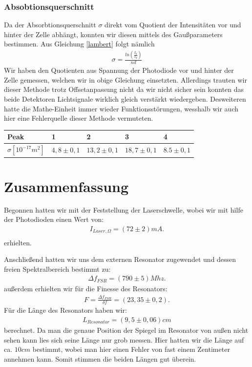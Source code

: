 \documentclass[12pt]{article}
\begin{document}
\subsubsection{Absobtionsquerschnitt}
Da der Absorbtionsquerschnitt $\sigma$ direkt vom Quotient der Intensitäten vor und hinter der Zelle abhängt, konnten wir diesen mittels des Gaußparameters bestimmen. Aus Gleichung \ref{lambert} folgt nämlich
\begin{align*}
 \sigma = \frac{ln \left( \frac{I_0}{I_d} \right) }{nd} 
\end{align*}
Wir haben den Quotienten aus Spannung der Photodiode vor und hinter der Zelle gemessen, welchen wir in obige Gleichung einsetzten. Allerdings trauten wir dieser Methode trotz Offsetanpassung nicht da wir nicht sicher sein konnten das beide Detektoren Lichtsignale wirklich gleich verstärkt wiedergeben. Desweiteren hatte die Mathe-Einheit immer wieder Funktionsstörungen, wesshalb wir auch hier eine Fehlerquelle dieser Methode vermuteten.
\begin{center}
\begin{tabular}{|l|l|l|l|l|}
\hline 
Peak & 1 & 2 & 3 & 4\\
\hline
$\sigma [10^{-17} m^2]$ & $4,8 \pm 0,1$ & $13,2 \pm 0,1$ & $18,7 \pm 0,1$ & $8.5 \pm 0,1$\\
\hline
\end{tabular}
\end{center}

\section{Zusammenfassung}
Begonnen hatten wir mit der Feststellung der Laserschwelle, wobei wir mit hilfe der Photodioden einen Wert von:
\begin{align*}
 I_{Laser, \Omega} = (72 \pm 2) mA. \\
\end{align*}
erhielten.

Anschließend hatten wir uns dem externen Resonator zugewendet und dessen freien Spektralbereich bestimmt zu:
\begin{align*}
 \Delta f_{FSR} = (790\pm5) Mhz.
\end{align*}
außerdem erhielten wir für die Finesse des Resonators:
\begin{align*}
 F = \frac{\Delta f_{FSR}}{\delta f} = ( 23,35 \pm 0,2 ).
\end{align*}
Für die Länge des Resonators haben wir:
\begin{align*}
 L_{Resonator}= (9,5 \pm 0,06) cm
\end{align*}
berechnet. Da man die genaue Position der Spiegel im Resonator von außen nicht sehen kann lies sich seine Länge nur grob messen. Hier hatten wir die Länge auf ca. $10cm$ bestimmt, wobei man hier einen Fehler von fast einem Zentimeter annehmen kann. Somit stimmen die beiden Längen gut überein.
\end{document}
